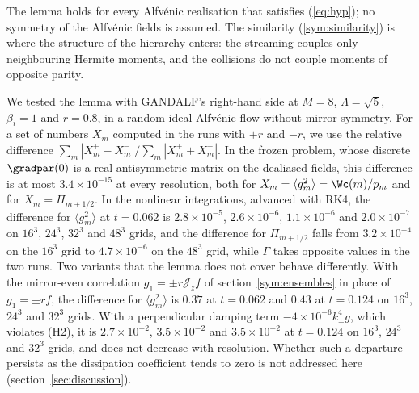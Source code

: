 The lemma holds for every Alfv\'enic realisation that satisfies (\ref{eq:hyp}); no symmetry of the Alfv\'enic fields is assumed. The similarity (\ref{sym:similarity}) is where the structure of the hierarchy enters: the streaming couples only neighbouring Hermite moments, and the collisions do not couple moments of opposite parity.

We tested the lemma with GANDALF's right-hand side at $M=8$, $\Lambda=\sqrt5$, $\beta_i=1$ and $r=0.8$, in a random ideal Alfv\'enic flow without mirror symmetry. For a set of numbers $X_m$ computed in the runs with $+r$ and $-r$, we use the relative difference $\sum_m|X_m^+-X_m^-|/\sum_m|X_m^++X_m^-|$. In the frozen problem, whose discrete $\gradpar(0)$ is a real antisymmetric matrix on the dealiased fields, this difference is at most $3.4\times10^{-15}$ at every resolution, both for $X_m=\langle g_m^2\rangle=\Wc(m)/p_m$ and for $X_m=\Pi_{m+1/2}$. In the nonlinear integrations, advanced with RK4, the difference for $\langle g_m^2\rangle$ at $t=0.062$ is $2.8\times10^{-5}$, $2.6\times10^{-6}$, $1.1\times10^{-6}$ and $2.0\times10^{-7}$ on $16^3$, $24^3$, $32^3$ and $48^3$ grids, and the difference for $\Pi_{m+1/2}$ falls from $3.2\times10^{-4}$ on the $16^3$ grid to $4.7\times10^{-6}$ on the $48^3$ grid, while $\Gamma$ takes opposite values in the two runs. Two variants that the lemma does not cover behave differently. With the mirror-even correlation $g_1=\pm r\mathcal J_zf$ of section~\ref{sym:ensembles} in place of $g_1=\pm rf$, the difference for $\langle g_m^2\rangle$ is $0.37$ at $t=0.062$ and $0.43$ at $t=0.124$ on $16^3$, $24^3$ and $32^3$ grids. With a perpendicular damping term $-4\times10^{-6}k_\perp^4g$, which violates (H2), it is $2.7\times10^{-2}$, $3.5\times10^{-2}$ and $3.5\times10^{-2}$ at $t=0.124$ on $16^3$, $24^3$ and $32^3$ grids, and does not decrease with resolution. Whether such a departure persists as the dissipation coefficient tends to zero is not addressed here (section~\ref{sec:discussion}).

